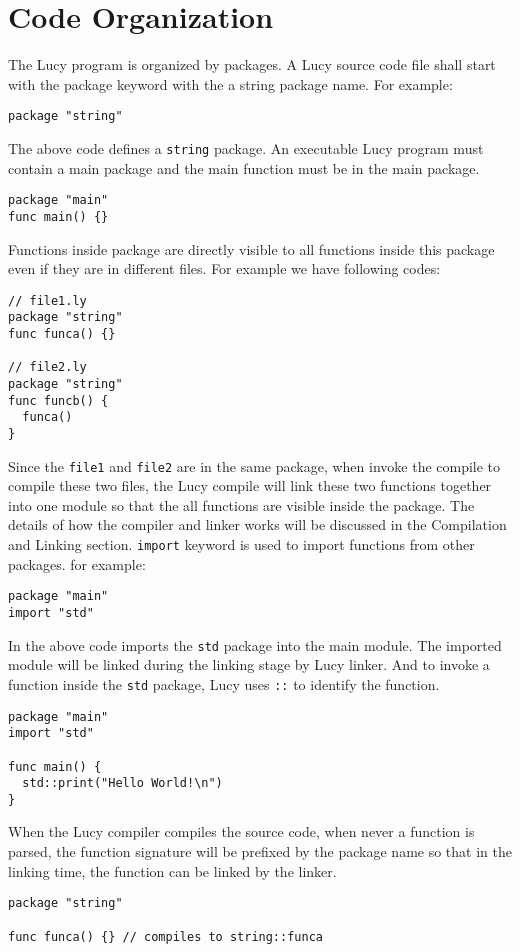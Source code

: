 \section{Code Organization}
The Lucy program is organized by packages. A Lucy source code file shall start with the package keyword with the a string package name. For example:
\begin{lstlisting}
package "string"
\end{lstlisting}
The above code defines a \texttt{string} package. An executable Lucy program must contain a main package and the main function must be in the main package.
\begin{lstlisting}
package "main"
func main() {}
\end{lstlisting}
Functions inside package are directly visible to all functions inside this package even if they are in different files. For example we have following codes:
\begin{lstlisting}
// file1.ly
package "string"
func funca() {}

// file2.ly
package "string"
func funcb() {
  funca()
}
\end{lstlisting}
Since the \texttt{file1} and \texttt{file2} are in the same package, when invoke the compile to compile these two files, the Lucy compile will link these two functions together into one module so that the all functions are visible inside the package. The details of how the compiler and linker works will be discussed in the Compilation and Linking section.
\texttt{import} keyword is used to import functions from other packages. for example:
\begin{lstlisting}
package "main"
import "std"
\end{lstlisting}
In the above code imports the \texttt{std} package into the main module. The imported module will be linked during the linking stage by Lucy linker. And to invoke a function inside the \texttt{std} package, Lucy uses \texttt{::} to identify the function.
\begin{lstlisting}
package "main"
import "std"

func main() {
  std::print("Hello World!\n")
}
\end{lstlisting}
When the Lucy compiler compiles the source code, when never a function is parsed, the function signature will be prefixed by the package name so that in the linking time, the function can be linked by the linker.
\begin{lstlisting}
package "string"

func funca() {} // compiles to string::funca
\end{lstlisting}
